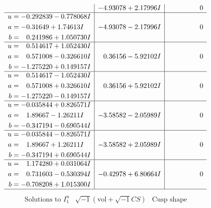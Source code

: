 \documentclass[1p]{elsarticle_modified}
\theoremstyle{definition}
\newcommand{\I}{\sqrt{-1}}
\begin{document}
$$\begin{array}{c|c|c}
 & -4.93078 + 2.17996 I & \phantom{-0.000000 } 0 \\ \hline\begin{aligned}
u &= -0.292839 - 0.778068 I \\
a &= -0.31649 + 1.74613 I \\
b &= \phantom{-}0.241986 + 1.050730 I\end{aligned}
 & -4.93078 - 2.17996 I & \phantom{-0.000000 } 0 \\ \hline\begin{aligned}
u &= \phantom{-}0.514617 + 1.052430 I \\
a &= \phantom{-}0.571008 - 0.326610 I \\
b &= -1.275220 + 0.149157 I\end{aligned}
 & \phantom{-}0.36156 - 5.92102 I & \phantom{-0.000000 } 0 \\ \hline\begin{aligned}
u &= \phantom{-}0.514617 - 1.052430 I \\
a &= \phantom{-}0.571008 + 0.326610 I \\
b &= -1.275220 - 0.149157 I\end{aligned}
 & \phantom{-}0.36156 + 5.92102 I & \phantom{-0.000000 } 0 \\ \hline\begin{aligned}
u &= -0.035844 + 0.826571 I \\
a &= \phantom{-}1.89667 - 1.26211 I \\
b &= -0.347194 - 0.690544 I\end{aligned}
 & -3.58582 - 2.05989 I & \phantom{-0.000000 } 0 \\ \hline\begin{aligned}
u &= -0.035844 - 0.826571 I \\
a &= \phantom{-}1.89667 + 1.26211 I \\
b &= -0.347194 + 0.690544 I\end{aligned}
 & -3.58582 + 2.05989 I & \phantom{-0.000000 } 0 \\ \hline\begin{aligned}
u &= \phantom{-}1.174280 + 0.031064 I \\
a &= \phantom{-}0.731603 - 0.530394 I \\
b &= -0.708208 + 1.015300 I\end{aligned}
 & -0.42978 + 6.80664 I & \phantom{-0.000000 } 0\\
 \hline 
 \end{array}$$\newpage$$\begin{array}{c|c|c}  
\text{Solutions to }I^u_{1}& \I (\text{vol} + \sqrt{-1}CS) & \text{Cusp shape}\\

\end{array}$$
\end{document}
